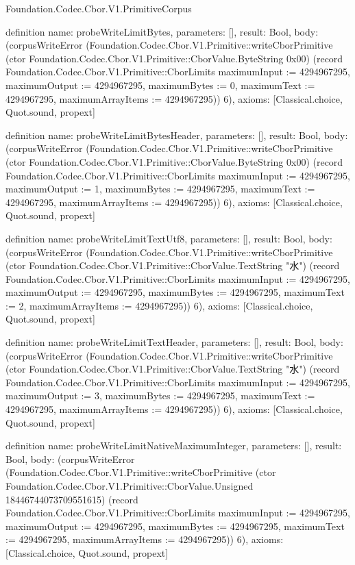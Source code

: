 \begin{lexlean}{Foundation.Codec.Cbor.V1.PrimitiveCorpus}
\begin{semanticmodule}
definition{
  name: probeWriteLimitBytes,
  parameters: [],
  result: Bool,
  body: (corpusWriteError (Foundation.Codec.Cbor.V1.Primitive::writeCborPrimitive (ctor Foundation.Codec.Cbor.V1.Primitive::CborValue.ByteString 0x00) (record Foundation.Codec.Cbor.V1.Primitive::CborLimits {maximumInput := 4294967295, maximumOutput := 4294967295, maximumBytes := 0, maximumText := 4294967295, maximumArrayItems := 4294967295})) 6),
  axioms: [Classical.choice, Quot.sound, propext]
}

definition{
  name: probeWriteLimitBytesHeader,
  parameters: [],
  result: Bool,
  body: (corpusWriteError (Foundation.Codec.Cbor.V1.Primitive::writeCborPrimitive (ctor Foundation.Codec.Cbor.V1.Primitive::CborValue.ByteString 0x00) (record Foundation.Codec.Cbor.V1.Primitive::CborLimits {maximumInput := 4294967295, maximumOutput := 1, maximumBytes := 4294967295, maximumText := 4294967295, maximumArrayItems := 4294967295})) 6),
  axioms: [Classical.choice, Quot.sound, propext]
}

definition{
  name: probeWriteLimitTextUtf8,
  parameters: [],
  result: Bool,
  body: (corpusWriteError (Foundation.Codec.Cbor.V1.Primitive::writeCborPrimitive (ctor Foundation.Codec.Cbor.V1.Primitive::CborValue.TextString "水") (record Foundation.Codec.Cbor.V1.Primitive::CborLimits {maximumInput := 4294967295, maximumOutput := 4294967295, maximumBytes := 4294967295, maximumText := 2, maximumArrayItems := 4294967295})) 6),
  axioms: [Classical.choice, Quot.sound, propext]
}

definition{
  name: probeWriteLimitTextHeader,
  parameters: [],
  result: Bool,
  body: (corpusWriteError (Foundation.Codec.Cbor.V1.Primitive::writeCborPrimitive (ctor Foundation.Codec.Cbor.V1.Primitive::CborValue.TextString "水") (record Foundation.Codec.Cbor.V1.Primitive::CborLimits {maximumInput := 4294967295, maximumOutput := 3, maximumBytes := 4294967295, maximumText := 4294967295, maximumArrayItems := 4294967295})) 6),
  axioms: [Classical.choice, Quot.sound, propext]
}

definition{
  name: probeWriteLimitNativeMaximumInteger,
  parameters: [],
  result: Bool,
  body: (corpusWriteError (Foundation.Codec.Cbor.V1.Primitive::writeCborPrimitive (ctor Foundation.Codec.Cbor.V1.Primitive::CborValue.Unsigned 18446744073709551615) (record Foundation.Codec.Cbor.V1.Primitive::CborLimits {maximumInput := 4294967295, maximumOutput := 4294967295, maximumBytes := 4294967295, maximumText := 4294967295, maximumArrayItems := 4294967295})) 6),
  axioms: [Classical.choice, Quot.sound, propext]
}


\end{semanticmodule}
\end{lexlean}
